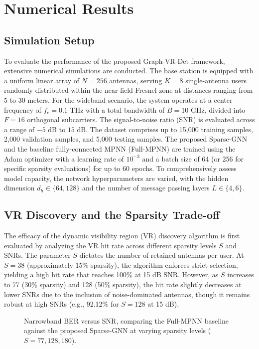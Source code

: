 \section{Numerical Results}

\subsection{Simulation Setup}
To evaluate the performance of the proposed Graph-VR-Det framework, extensive numerical simulations are conducted. The base station is equipped with a uniform linear array of $N=256$ antennas, serving $K=8$ single-antenna users randomly distributed within the near-field Fresnel zone at distances ranging from 5 to 30 meters. For the wideband scenario, the system operates at a center frequency of $f_c = 0.1$ THz with a total bandwidth of $B=10$ GHz, divided into $F=16$ orthogonal subcarriers. The signal-to-noise ratio (SNR) is evaluated across a range of $-5$ dB to $15$ dB. The dataset comprises up to 15,000 training samples, 2,000 validation samples, and 5,000 testing samples. The proposed Sparse-GNN and the baseline fully-connected MPNN (Full-MPNN) are trained using the Adam optimizer with a learning rate of $10^{-3}$ and a batch size of 64 (or 256 for specific sparsity evaluations) for up to 60 epochs. To comprehensively assess model capacity, the network hyperparameters are varied, with the hidden dimension $d_h \in \{64, 128\}$ and the number of message passing layers $L \in \{4, 6\}$.

\subsection{VR Discovery and the Sparsity Trade-off}
The efficacy of the dynamic visibility region (VR) discovery algorithm is first evaluated by analyzing the VR hit rate across different sparsity levels $S$ and SNRs. The parameter $S$ dictates the number of retained antennas per user. At $S=38$ (approximately 15\% sparsity), the algorithm enforces strict selection, yielding a high hit rate that reaches 100\% at 15 dB SNR. However, as $S$ increases to 77 (30\% sparsity) and 128 (50\% sparsity), the hit rate slightly decreases at lower SNRs due to the inclusion of noise-dominated antennas, though it remains robust at high SNRs (e.g., 92.12\% for $S=128$ at 15 dB). 

\begin{figure}[t]
\centering

\caption{Narrowband BER versus SNR, comparing the Full-MPNN baseline against the proposed Sparse-GNN at varying sparsity levels ($S=77, 128, 180$).}
\label{fig:ber_narrowband}
\end{figure}

